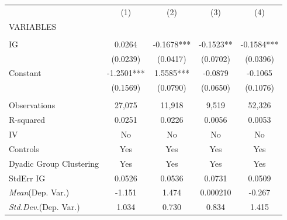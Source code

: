 \documentclass[]{article}
\begin{document}
\begin{tabular}{lcccc} \hline
 & (1) & (2) & (3) & (4) \\
VARIABLES &  &  &  &  \\ \hline
 &  &  &  &  \\
IG & 0.0264 & -0.1678*** & -0.1523** & -0.1584*** \\
 & (0.0239) & (0.0417) & (0.0702) & (0.0396) \\
Constant & -1.2501*** & 1.5585*** & -0.0879 & -0.1065 \\
 & (0.1569) & (0.0790) & (0.0650) & (0.1076) \\
 &  &  &  &  \\
Observations & 27,075 & 11,918 & 9,519 & 52,326 \\
R-squared & 0.0251 & 0.0226 & 0.0056 & 0.0053 \\
IV & No & No & No & No \\
Controls & Yes & Yes & Yes & Yes \\
Dyadic Group Clustering & Yes & Yes & Yes & Yes \\
StdErr IG & 0.0526 & 0.0536 & 0.0731 & 0.0509 \\
\textit{Mean}(Dep. Var.) & -1.151 & 1.474 & 0.000210 & -0.267 \\
 \textit{Std.Dev.}(Dep. Var.) & 1.034 & 0.730 & 0.834 & 1.415 \\ \hline
\end{tabular}
\end{document}
